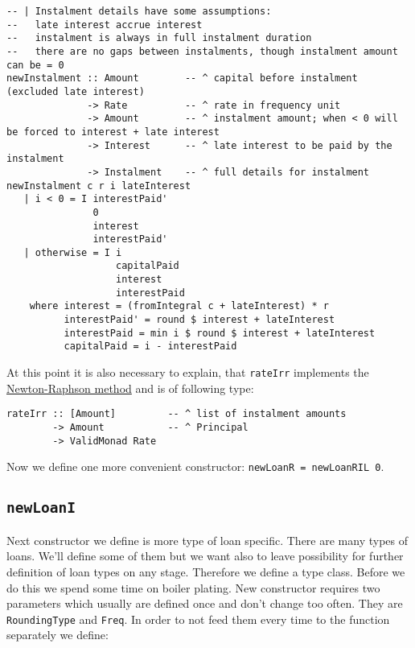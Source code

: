 \documentclass[letterpaper,11pt]{article}
\begin{document}
{\small
\begin{verbatim}
-- | Instalment details have some assumptions:
--   late interest accrue interest
--   instalment is always in full instalment duration
--   there are no gaps between instalments, though instalment amount can be = 0
newInstalment :: Amount        -- ^ capital before instalment (excluded late interest)
              -> Rate          -- ^ rate in frequency unit
              -> Amount        -- ^ instalment amount; when < 0 will be forced to interest + late interest
              -> Interest      -- ^ late interest to be paid by the instalment
              -> Instalment    -- ^ full details for instalment
newInstalment c r i lateInterest
   | i < 0 = I interestPaid'
               0
               interest
               interestPaid'
   | otherwise = I i
                   capitalPaid
                   interest
                   interestPaid
    where interest = (fromIntegral c + lateInterest) * r
          interestPaid' = round $ interest + lateInterest
          interestPaid = min i $ round $ interest + lateInterest
          capitalPaid = i - interestPaid
\end{verbatim}
}

At this point it is also necessary to explain, that {\tt rateIrr} implements the \href{http://en.wikipedia.org/wiki/Newton%27s_method}{Newton-Raphson method} and is of following type:

{\small
\begin{verbatim}
rateIrr :: [Amount]         -- ^ list of instalment amounts
        -> Amount           -- ^ Principal
        -> ValidMonad Rate
\end{verbatim}
}

Now we define one more convenient constructor: {\tt newLoanR = newLoanRIL 0}.

\subsection{\tt newLoanI}
Next constructor we define is more type of loan specific. There are many types of loans. We'll define some of them but we want also to leave possibility for further definition of loan types on any stage. Therefore we define a type class. Before we do this we spend some time on boiler plating. New constructor requires two parameters which usually are defined once and don't change too often. They are {\tt RoundingType} and {\tt Freq}. In order to not feed them every time to the function separately we define:
\end{document}
